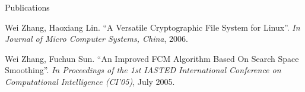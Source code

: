 \begin{vitae}
{\begin{vitaesection}{Publications}
\item Wei Zhang, Haoxiang Lin. ``A Versatile Cryptographic File System for Linux''. {\it In Journal of Micro Computer Systems, China}, 2006.

\item Wei Zhang, Fuchun Sun. ``An Improved FCM Algorithm Based On Search Space Smoothing''. {\it In Proceedings of the 1st IASTED International Conference on Computational Intelligence (CI'05)}, July 2005.

\vspace{0.3cm}


\end{vitaesection}

}

\end{vitae}

